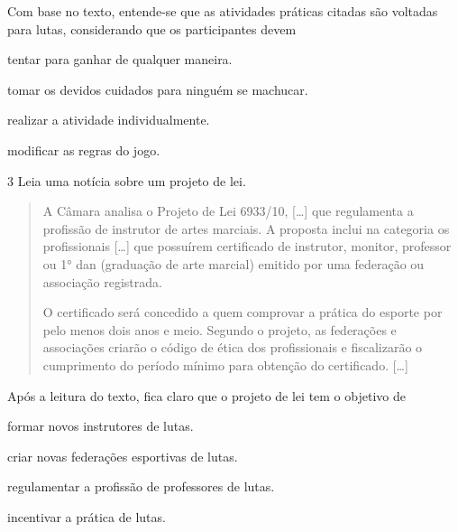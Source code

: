 \noindent{}Com base no texto, entende-se que as atividades práticas citadas são voltadas para
lutas, considerando que os participantes devem

\begin{escolha}
\item tentar para ganhar de qualquer maneira.

\item tomar os devidos cuidados para ninguém se machucar.

\item realizar a atividade individualmente.

\item modificar as regras do jogo.
\end{escolha}


\num{3} Leia uma notícia sobre um projeto de lei.
\begin{quote}
  A Câmara analisa o Projeto de Lei 6933/10, {[}\ldots{}{]} que regulamenta a
  profissão de instrutor de artes marciais. A proposta inclui na
  categoria os profissionais {[}\ldots{}{]} que possuírem certificado de
  instrutor, monitor, professor ou 1° dan (graduação de arte marcial)
  emitido por uma federação ou associação registrada.

O certificado será concedido a quem comprovar a prática do esporte por
pelo menos dois anos e meio. Segundo o projeto, as federações e
associações criarão o código de ética dos profissionais e fiscalizarão o
cumprimento do período mínimo para obtenção do certificado. {[}\ldots{}{]}

\end{quote}

\noindent{}Após a leitura do texto, fica claro que o projeto de lei tem o objetivo de

\begin{escolha}
\item formar novos instrutores de lutas.

\item criar novas federações esportivas de lutas.

\item regulamentar a profissão de professores de lutas.

\item incentivar a prática de lutas.
\end{escolha}

